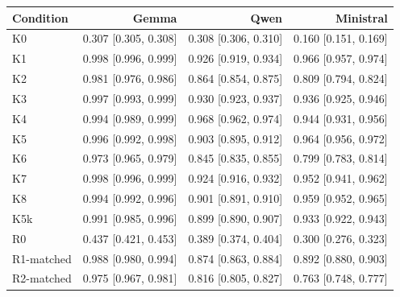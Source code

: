 \begin{tabular}{lrrr}
\toprule
Condition & Gemma & Qwen & Ministral \\
\midrule
K0 & 0.307 [0.305, 0.308] & 0.308 [0.306, 0.310] & 0.160 [0.151, 0.169] \\
K1 & 0.998 [0.996, 0.999] & 0.926 [0.919, 0.934] & 0.966 [0.957, 0.974] \\
K2 & 0.981 [0.976, 0.986] & 0.864 [0.854, 0.875] & 0.809 [0.794, 0.824] \\
K3 & 0.997 [0.993, 0.999] & 0.930 [0.923, 0.937] & 0.936 [0.925, 0.946] \\
K4 & 0.994 [0.989, 0.999] & 0.968 [0.962, 0.974] & 0.944 [0.931, 0.956] \\
K5 & 0.996 [0.992, 0.998] & 0.903 [0.895, 0.912] & 0.964 [0.956, 0.972] \\
K6 & 0.973 [0.965, 0.979] & 0.845 [0.835, 0.855] & 0.799 [0.783, 0.814] \\
K7 & 0.998 [0.996, 0.999] & 0.924 [0.916, 0.932] & 0.952 [0.941, 0.962] \\
K8 & 0.994 [0.992, 0.996] & 0.901 [0.891, 0.910] & 0.959 [0.952, 0.965] \\
K5k & 0.991 [0.985, 0.996] & 0.899 [0.890, 0.907] & 0.933 [0.922, 0.943] \\
R0 & 0.437 [0.421, 0.453] & 0.389 [0.374, 0.404] & 0.300 [0.276, 0.323] \\
R1-matched & 0.988 [0.980, 0.994] & 0.874 [0.863, 0.884] & 0.892 [0.880, 0.903] \\
R2-matched & 0.975 [0.967, 0.981] & 0.816 [0.805, 0.827] & 0.763 [0.748, 0.777] \\
\bottomrule
\end{tabular}
